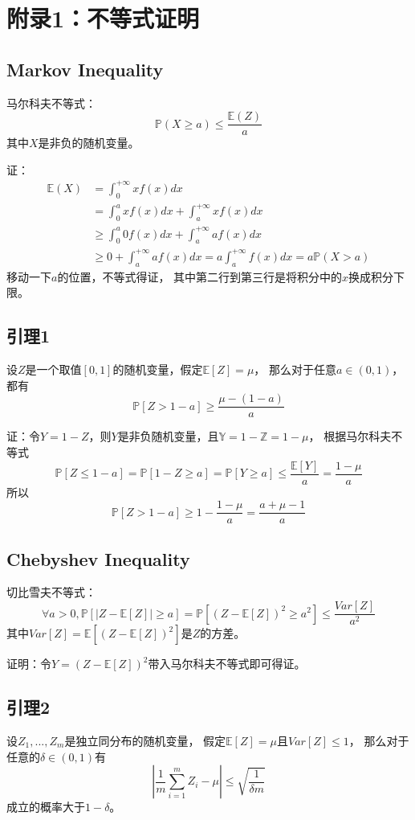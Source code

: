\documentclass[UTF8]{ctexart}
\begin{document}
%
%

\section{附录1：不等式证明}
\subsection{Markov Inequality}
马尔科夫不等式：
$$
\mathbb{P}(X\geq a)\leq \frac{\mathbb{E}(Z)}{a}
$$
其中$X$是非负的随机变量。

证：
$$
\begin{aligned}
\mathbb{E}(X) &=  \int_0^{+\infty}{xf(x)dx} \\
	&= \int_0^{a}{xf(x)dx} + \int_a^{+\infty}{xf(x)dx} \\
	&\geq 
	\int_0^{a}{0f(x)dx} + \int_a^{+\infty}{af(x)dx}\\
	&\geq 0 + \int_a^{+\infty}{af(x)dx} 
   = a\int_a^{+\infty}{f(x)dx} = a\mathbb{P}(X>a)
\end{aligned}
$$
移动一下$a$的位置，不等式得证，
其中第二行到第三行是将积分中的$x$换成积分下限。

\subsection{引理1}

设$Z$是一个取值$[0,1]$的随机变量，假定$\mathbb{E}[Z]=\mu$，
那么对于任意$a\in (0,1)$，都有
$$
\mathbb{P}[Z>1-a]\geq\frac{\mu-(1-a)}{a}
$$

证：令$Y=1-Z$，则$Y$是非负随机变量，且$\mathbb{Y}=1-\mathbb{Z}=1-\mu$，
根据马尔科夫不等式
$$
\mathbb{P}[Z\leq 1-a]=
\mathbb{P}[1-Z\geq a]=
\mathbb{P}[Y\geq a]\leq \frac{\mathbb{E}[Y]}{a}=\frac{1-\mu}{a}
$$
所以
$$
\mathbb{P}[Z>1-a]\geq 1-\frac{1-\mu}{a} = \frac{a+\mu-1}{a}
$$


\subsection{Chebyshev Inequality}
切比雪夫不等式：
$$
\forall a>0,
\mathbb{P}[|Z-\mathbb{E}[Z]|\geq a] = 
\mathbb{P}[(Z-\mathbb{E}[Z])^2 \geq a^2] \leq
\frac{Var[Z]}{a^2}
$$
其中$Var[Z]=\mathbb{E}[(Z-\mathbb{E}[Z])^2]$是$Z$的方差。

证明：令$Y=(Z-\mathbb{E}[Z])^2$带入马尔科夫不等式即可得证。

\subsection{引理2}
设$Z_1,...,Z_m$是独立同分布的随机变量，
假定$\mathbb{E}[Z]=\mu$且$Var[Z]\leq 1$，
那么对于任意的$\delta\in(0,1)$有
$$
|\frac{1}{m}\sum^m_{i=1}Z_i-\mu|\leq \sqrt{\frac{1}{\delta m}}
$$
成立的概率大于$1-\delta$。
\end{document}

